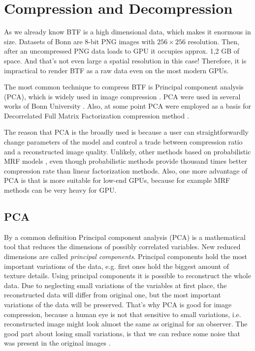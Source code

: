 \section{Compression and Decompression}
\label{section:compression_and_decompression}

As we already know BTF is a high dimensional data, which makes it enormous in size.
Datasets of Bonn are 8-bit PNG images with $256\times256$ resolution.
 Then, after an uncompressed PNG data loads to GPU it occupies approx. 1,2 GB of space. And that's not even large a spatial resolution in this case!
 Therefore, it is impractical to render BTF as a raw data even on the most modern GPUs.
 
 The most common technique to compress BTF is Principal component analysis (PCA), which is widely used in image compression \cite[Ch.\ 15]{haindl,gpu_gems}.
 PCA were used in several works of Bonn University \cite{sattler-2003-efficient,mueller-2003-compression,mueller-2004-environmental}.
 Also, at some point PCA were employed as a basis for Decorrelated Full Matrix Factorization compression method \cite{webglbtfstreaming}.
 
 The reason that PCA is the broadly used is because a user can straightforwardly change parameters of the model and control a trade between compression ratio and a reconstructed image quality.
 Unlikely, other methods based on probabilistic MRF models \cite{haindl}, even though probabilistic  methods provide thousand times better compression rate than linear factorization methods.
 Also, one more advantage of PCA is that is more suitable for low-end GPUs, because for example MRF methods can be very heavy for GPU.
 
 
\subsection{PCA}
\label{section:pca}

By a common definition Principal component analysis (PCA) is a mathematical tool that reduces the dimensions of possibly correlated variables. New reduced dimensions are called \emph{principal components}.
Principal components hold the most important variations of the data, e.g. first ones hold the biggest amount of texture details. Using principal components it is possible to reconstruct the whole data. 
Due to neglecting small variations of the variables at first place, the reconstructed data will differ from original one, but the most important variations of the data will be preserved. 
That's why PCA is good for image compression, because a human eye is not that sensitive to small variations, i.e. reconstructed image might look almost the same as original for an observer.
The good part about losing small variations, is that we can reduce some noise that was present in the original images \cite{pca_noise}.
